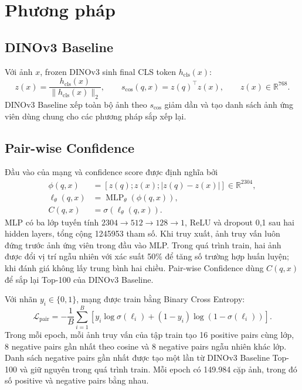 \documentclass[11pt,a4paper]{article}
\begin{document}
\section{Phương pháp}
\subsection{DINOv3 Baseline}
Với ảnh $x$, frozen DINOv3 sinh final CLS token $h_{\mathrm{cls}}(x)$:
\begin{equation}
 z(x)=\frac{h_{\mathrm{cls}}(x)}{\lVert h_{\mathrm{cls}}(x)\rVert_2},
 \qquad s_{\cos}(q,x)=z(q)^\top z(x), \qquad z(x)\in\mathbb{R}^{768}.
\end{equation}
DINOv3 Baseline xếp toàn bộ ảnh theo $s_{\cos}$ giảm dần và tạo danh sách
ảnh ứng viên dùng chung cho các phương pháp sắp xếp lại.

\subsection{Pair-wise Confidence}
Đầu vào của mạng và confidence score được định nghĩa bởi
\begin{align}
 \phi(q,x)&=[z(q);z(x);|z(q)-z(x)|]\in\mathbb{R}^{2304},\\
 \ell_\theta(q,x)&=\operatorname{MLP}_\theta(\phi(q,x)),\\
 C(q,x)&=\sigma(\ell_\theta(q,x)).
\end{align}
MLP có ba lớp tuyến tính $2304\rightarrow512\rightarrow128\rightarrow1$,
ReLU và dropout 0,1 sau hai hidden layers, tổng cộng \num{1245953} tham số.
Khi truy xuất, ảnh truy vấn luôn đứng trước ảnh ứng viên trong đầu vào MLP.
Trong quá trình train, hai ảnh được đổi vị trí ngẫu nhiên với xác suất 50\%
để tăng số trường hợp huấn luyện; khi đánh giá không lấy trung bình hai chiều.
Pair-wise Confidence dùng $C(q,x)$ để sắp lại Top-100 của DINOv3 Baseline.

Với nhãn $y_i\in\{0,1\}$, mạng được train bằng Binary Cross Entropy:
\begin{equation}
 \mathcal{L}_{\mathrm{pair}}=-\frac{1}{B}\sum_{i=1}^{B}
 \left[y_i\log\sigma(\ell_i)+(1-y_i)\log(1-\sigma(\ell_i))\right].
\end{equation}
Trong mỗi epoch, mỗi ảnh truy vấn của tập train tạo 16 positive pairs cùng
lớp, 8 negative pairs gần nhất theo cosine và 8 negative pairs ngẫu nhiên
khác lớp. Danh sách negative pairs gần nhất được tạo một lần từ DINOv3
Baseline Top-100 và giữ nguyên trong quá trình train. Mỗi epoch có 149.984
cặp ảnh, trong đó số positive và negative pairs bằng nhau.
\end{document}
